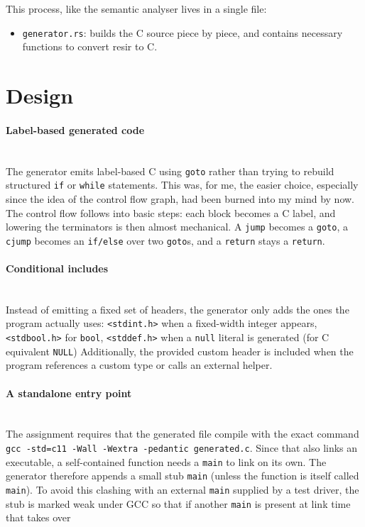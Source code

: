 \documentclass[11pt,a4paper,oneside]{report}
\begin{document}
	This process, like the semantic analyser lives in a single file:
	
	\begin{itemize}
		\item \texttt{generator.rs}: builds the C source piece by piece, and contains necessary functions to convert resir to C. 
	\end{itemize}
	
	
	\section{Design}
	\paragraph{Label-based generated code}\mbox{}\\
	The generator emits label-based C using \texttt{goto} rather than trying to rebuild structured \texttt{if} or \texttt{while} statements. This was, for me, the easier choice, especially since the idea of the control flow graph, had been burned into my mind by now. The control flow follows into basic steps: each block becomes a C label, and lowering the terminators is then almost mechanical. A \texttt{jump} becomes a \texttt{goto}, a \texttt{cjump} becomes an \texttt{if/else} over two \texttt{goto}s, and a \texttt{return} stays a \texttt{return}. 
	
	\paragraph{Conditional includes}\mbox{}\\
	Instead of emitting a fixed set of headers, the generator only adds the ones the program actually uses: \texttt{<stdint.h>} when a fixed-width integer appears, \texttt{<stdbool.h>} for \texttt{bool}, \texttt{<stddef.h>} when a \texttt{null} literal is generated (for C equivalent \texttt{NULL}) Additionally, the provided custom header is included when the program references a custom type or calls an external helper.

	\paragraph{A standalone entry point}\mbox{}\\
	The assignment requires that the generated file compile with the exact command
	\texttt{gcc -std=c11 -Wall -Wextra -pedantic generated.c}. Since that
	also links an executable, a self-contained function needs a \texttt{main} to
	link on its own. The generator therefore appends a small stub \texttt{main}
	(unless the function is itself called \texttt{main}). To avoid this clashing
	with an external \texttt{main} supplied by a test driver, the stub is marked
	weak under GCC so that if another \texttt{main} is present at link
	time that takes over
	
\end{document}
